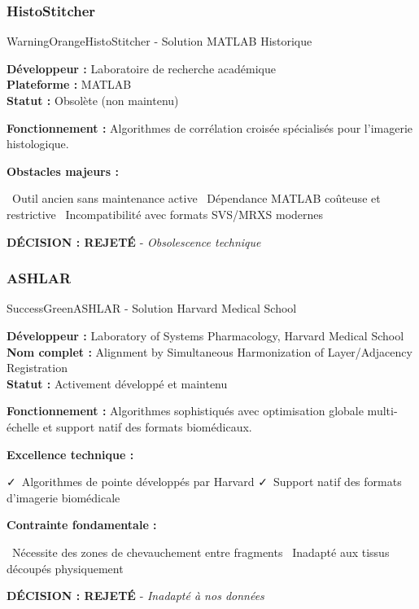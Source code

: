 \documentclass[12pt,a4paper]{report}
\newcommand{\pro}[1]{\textcolor{SuccessGreen}{\faCheck\ #1}}
\newcommand{\con}[1]{\textcolor{DangerRed}{\faTimes\ #1}}
\begin{document}
\subsubsection{HistoStitcher}

\begin{techbox}{WarningOrange}{HistoStitcher - Solution MATLAB Historique}

\textbf{Développeur :} Laboratoire de recherche académique \\
\textbf{Plateforme :} MATLAB \\
\textbf{Statut :} Obsolète (non maintenu)

\textbf{Fonctionnement :} Algorithmes de corrélation croisée spécialisés pour l'imagerie histologique.

\textbf{Obstacles majeurs :}
\begin{itemize}[leftmargin=*]
    \con{Outil ancien sans maintenance active}
    \con{Dépendance MATLAB coûteuse et restrictive}
    \con{Incompatibilité avec formats SVS/MRXS modernes}
\end{itemize}

\begin{center}
\textbf{\textcolor{DangerRed}{DÉCISION : REJETÉ}} - \textit{Obsolescence technique}
\end{center}

\end{techbox}

\subsubsection{ASHLAR}

\begin{techbox}{SuccessGreen}{ASHLAR - Solution Harvard Medical School}

\textbf{Développeur :} Laboratory of Systems Pharmacology, Harvard Medical School \\
\textbf{Nom complet :} Alignment by Simultaneous Harmonization of Layer/Adjacency Registration \\
\textbf{Statut :} Activement développé et maintenu

\textbf{Fonctionnement :} Algorithmes sophistiqués avec optimisation globale multi-échelle et support natif des formats biomédicaux.

\textbf{Excellence technique :}
\begin{itemize}[leftmargin=*]
    \pro{Algorithmes de pointe développés par Harvard}
    \pro{Support natif des formats d'imagerie biomédicale}
\end{itemize}

\textbf{Contrainte fondamentale :}
\begin{itemize}[leftmargin=*]
    \con{Nécessite des zones de chevauchement entre fragments}
    \con{Inadapté aux tissus découpés physiquement}
\end{itemize}

\begin{center}
\textbf{\textcolor{WarningOrange}{DÉCISION : REJETÉ}} - \textit{Inadapté à nos données}
\end{center}

\end{techbox}
\end{document}
